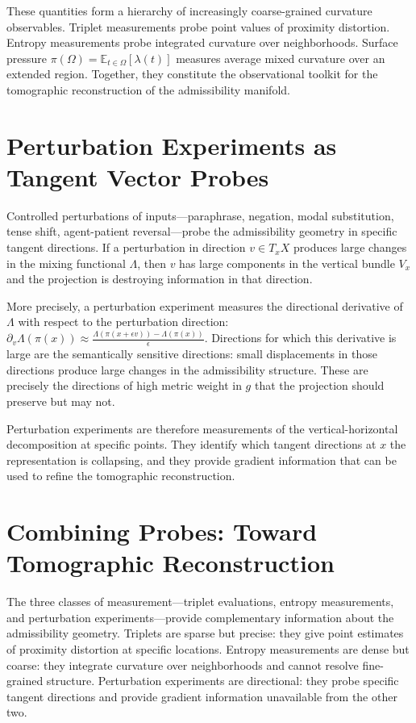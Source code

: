 \documentclass[12pt, oneside]{book}
\theoremstyle{plain-flyxion}
\theoremstyle{definition-flyxion}
\newcommand{\Lam}{\Lambda}
\begin{document}
These quantities form a hierarchy of increasingly coarse-grained curvature observables.
Triplet measurements probe point values of proximity distortion. Entropy measurements
probe integrated curvature over neighborhoods. Surface pressure $\pi(\Omega) =
\mathbb{E}_{t\in\Omega}[\lambda(t)]$ measures average mixed curvature over an extended
region. Together, they constitute the observational toolkit for the tomographic
reconstruction of the admissibility manifold.

\section{Perturbation Experiments as Tangent Vector Probes}

Controlled perturbations of inputs---paraphrase, negation, modal substitution, tense
shift, agent-patient reversal---probe the admissibility geometry in specific tangent
directions. If a perturbation in direction $v\in T_xX$ produces large changes in the
mixing functional $\Lam$, then $v$ has large components in the vertical bundle $V_x$ and
the projection is destroying information in that direction.

More precisely, a perturbation experiment measures the directional derivative of $\Lam$
with respect to the perturbation direction: $\partial_v \Lam(\pi(x)) \approx
\frac{\Lam(\pi(x+\epsilon v)) - \Lam(\pi(x))}{\epsilon}$. Directions for which this
derivative is large are the semantically sensitive directions: small displacements in
those directions produce large changes in the admissibility structure. These are precisely
the directions of high metric weight in $g$ that the projection should preserve but
may not.

Perturbation experiments are therefore measurements of the vertical-horizontal
decomposition at specific points. They identify which tangent directions at $x$ the
representation is collapsing, and they provide gradient information that can be used to
refine the tomographic reconstruction.

\section{Combining Probes: Toward Tomographic Reconstruction}

The three classes of measurement---triplet evaluations, entropy measurements, and
perturbation experiments---provide complementary information about the admissibility
geometry. Triplets are sparse but precise: they give point estimates of proximity
distortion at specific locations. Entropy measurements are dense but coarse: they
integrate curvature over neighborhoods and cannot resolve fine-grained structure. Perturbation
experiments are directional: they probe specific tangent directions and provide gradient
information unavailable from the other two.
\end{document}
